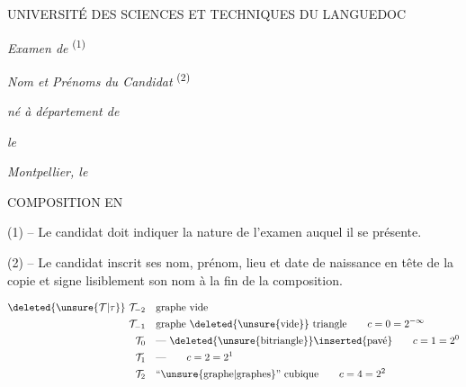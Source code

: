 UNIVERSITÉ DES SCIENCES ET TECHNIQUES DU LANGUEDOC

\textit{Examen de}\textsuperscript{ (1)} \dotfill

\noindent\dotfill

\textit{Nom et Prénoms du Candidat}\textsuperscript{ (2)} \dotfill

\textit{né à} \dotfill\quad \textit{département de} \dotfill

\textit{le} \dotfill{}

\textit{Montpellier, le} \dotfill{}

COMPOSITION EN \dotfill

(1) -- Le candidat doit indiquer la nature de l'examen auquel il se présente.

(2) -- Le candidat inscrit ses nom, prénom, lieu et date de naissance en tête de la copie et signe lisiblement son nom à la fin de la composition.

\[
\begin{aligned}
\deleted{\unsure{\mathcal T|\tau}}\ \mathcal T_{-2}&\quad\text{graphe vide}\\
\mathcal T_{-1}&\quad\text{graphe \deleted{\unsure{vide}} triangle}\qquad c=0=2^{-\infty}\\
\mathcal T_0&\quad\text{--- \deleted{\unsure{bitriangle}}\inserted{pavé}}\qquad c=1=2^0\\
\mathcal T_1&\quad\text{---}\qquad c=2=2^1\\
\mathcal T_2&\quad\text{``\unsure{graphe|graphes}'' cubique}\qquad c=4=2^2
\end{aligned}
\]

